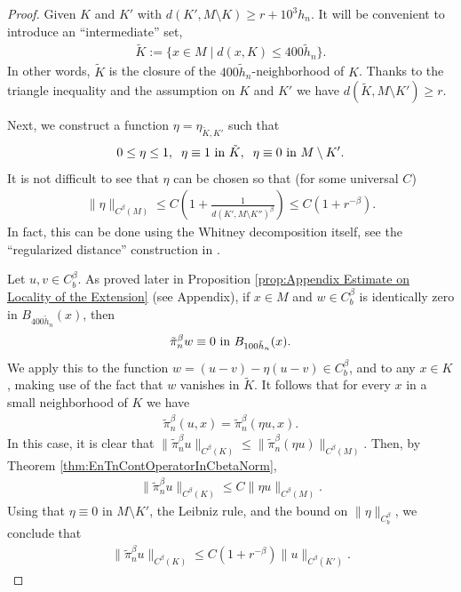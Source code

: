 \documentclass[11pt,reqno]{amsart}
\numberwithin{equation}{section}
\theoremstyle{plain}
\begin{document}
\begin{proof}
  Given $K$ and $K'$ with $d(K',M\setminus K)\geq r+10^3h_n$. It will be convenient to introduce an ``intermediate'' set, 
  \begin{align*}
    \tilde K:= \{ x\in M \mid d(x,K)\leq 400\tilde h_n \}.
  \end{align*}
  In other words, $\tilde K$ is the closure of the $400 \tilde h_n$-neighborhood of $K$. Thanks to the triangle inequality and the assumption on $K$ and $K'$ we have $d(\tilde K, M\setminus K')\geq r$.
  
  \noindent Next, we construct a function $\eta = \eta_{\tilde K,K'}$ such that 
  \begin{align*}
    0\leq \eta\leq 1,\;\;\eta \equiv 1 \textnormal{ in } \tilde K,\;\;\eta \equiv 0 \textnormal{ in } M\setminus K'.
  \end{align*}
  It is not difficult to see that $\eta$ can be chosen so that (for some universal $C$)
  \begin{align*}
    \|\eta\|_{C^\beta(M)} \leq C\left (1+\frac{1}{d(K',M\setminus K'')^\beta} \right ) \leq C\left ( 1+r^{-\beta} \right ).
  \end{align*}	 
  In fact, this can be done using the Whitney decomposition itself, see the ``regularized distance'' construction in \cite[Chapter 6, Section 2.1]{Stei-71} . 
  
  Let $u,v\in C^\beta_b$. As proved later in Proposition \ref{prop:Appendix Estimate on Locality of the Extension} (see Appendix), if $x\in M$ and $w \in C^\beta_b$ is identically zero in $B_{400 \tilde h_n}(x)$, then
  \begin{align*}
    \tilde \pi_n^\beta w \equiv 0 \textnormal{ in } B_{100\tilde h_n}(x).  
  \end{align*}
  We apply this to the function $w = (u-v)-\eta (u-v) \in C^\beta_b$, and to any $x\in K$, making use of the fact that $w$ vanishes in $\tilde K$.  It follows that for every $x$ in a small neighborhood of $K$ we have
  \begin{align*}
    \tilde \pi_n^\beta (u,x) = \tilde \pi_n^\beta(\eta u,x).	  
  \end{align*}	  
  In this case, it is clear that $\|\tilde \pi_n^\beta u\|_{C^\beta(K)}\leq \|\tilde \pi_n^\beta (\eta u)\|_{C^\beta(M)}$. Then, by Theorem \ref{thm:EnTnContOperatorInCbetaNorm}, 
  \begin{align*}
    \|\tilde \pi_n^\beta u\|_{C^\beta(K)} \leq C\|\eta u\|_{C^\beta(M)}.
  \end{align*}
  Using that $\eta \equiv 0$ in $M\setminus K'$, the Leibniz rule, and the bound on $\|\eta\|_{C^\beta_b}$, we conclude that
  \begin{align*}
    \|\tilde \pi_n^\beta u\|_{C^\beta(K)} \leq C(1+r^{-\beta})\|u\|_{C^\beta(K')}.
  \end{align*}
 
\end{proof}
\end{document}
